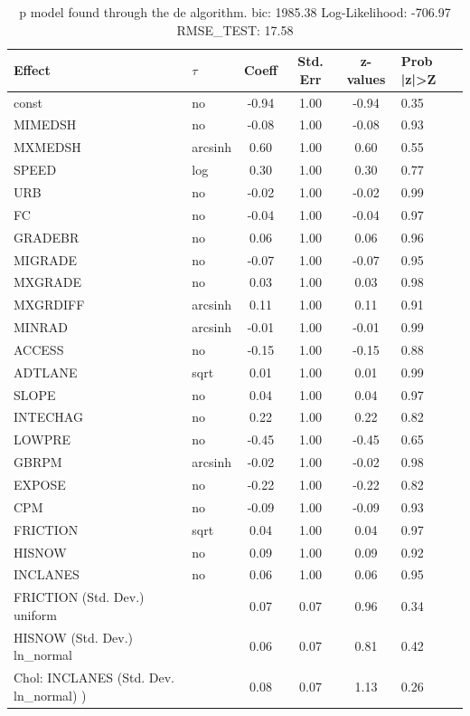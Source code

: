 \begin{table}
	\caption{p model found through the de algorithm. bic: 1985.38 Log-Likelihood: -706.97 RMSE_TEST: 17.58}
	\begin{center}
		\begin{tabular}{|l|l|c|c|c|l|}
			\hline
			Effect & $\tau$ & Coeff & Std. Err & z-values & Prob |z|>Z \\
			\hline
			const & no & -0.94 & 1.00 & -0.94 & 0.35 \\
			\hline
			MIMEDSH & no & -0.08 & 1.00 & -0.08 & 0.93 \\
			\hline
			MXMEDSH & arcsinh & 0.60 & 1.00 & 0.60 & 0.55 \\
			\hline
			SPEED & log & 0.30 & 1.00 & 0.30 & 0.77 \\
			\hline
			URB & no & -0.02 & 1.00 & -0.02 & 0.99 \\
			\hline
			FC & no & -0.04 & 1.00 & -0.04 & 0.97 \\
			\hline
			GRADEBR & no & 0.06 & 1.00 & 0.06 & 0.96 \\
			\hline
			MIGRADE & no & -0.07 & 1.00 & -0.07 & 0.95 \\
			\hline
			MXGRADE & no & 0.03 & 1.00 & 0.03 & 0.98 \\
			\hline
			MXGRDIFF & arcsinh & 0.11 & 1.00 & 0.11 & 0.91 \\
			\hline
			MINRAD & arcsinh & -0.01 & 1.00 & -0.01 & 0.99 \\
			\hline
			ACCESS & no & -0.15 & 1.00 & -0.15 & 0.88 \\
			\hline
			ADTLANE & sqrt & 0.01 & 1.00 & 0.01 & 0.99 \\
			\hline
			SLOPE & no & 0.04 & 1.00 & 0.04 & 0.97 \\
			\hline
			INTECHAG & no & 0.22 & 1.00 & 0.22 & 0.82 \\
			\hline
			LOWPRE & no & -0.45 & 1.00 & -0.45 & 0.65 \\
			\hline
			GBRPM & arcsinh & -0.02 & 1.00 & -0.02 & 0.98 \\
			\hline
			EXPOSE & no & -0.22 & 1.00 & -0.22 & 0.82 \\
			\hline
			CPM & no & -0.09 & 1.00 & -0.09 & 0.93 \\
			\hline
			FRICTION & sqrt & 0.04 & 1.00 & 0.04 & 0.97 \\
			\hline
			HISNOW & no & 0.09 & 1.00 & 0.09 & 0.92 \\
			\hline
			INCLANES & no & 0.06 & 1.00 & 0.06 & 0.95 \\
			\hline
			FRICTION (Std. Dev.) uniform &  & 0.07 & 0.07 & 0.96 & 0.34 \\
			\hline
			HISNOW (Std. Dev.) ln_normal &  & 0.06 & 0.07 & 0.81 & 0.42 \\
			\hline
			 Chol: INCLANES (Std. Dev. ln_normal) ) &  & 0.08 & 0.07 & 1.13 & 0.26 \\
			\hline
		\end{tabular}
	\end{center}
\end{table}